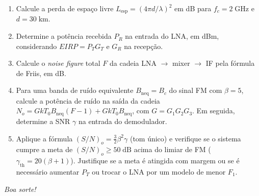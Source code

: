 \documentclass[11pt,a4paper]{article}
\begin{document}
\begin{enumerate}[label=\alph*)]
  \item Calcule a perda de espaço livre $L_{\text{esp}} = (4\pi d/\lambda)^2$ em dB para $f_c = 2\;\text{GHz}$ e $d = 30\;\text{km}$.
  \item Determine a potência recebida $P_R$ na entrada do LNA, em dBm, considerando $\mathit{EIRP} = P_T G_T$ e $G_R$ na recepção.
  \item Calcule o \emph{noise figure} total $F$ da cadeia LNA $\to$ mixer $\to$ IF pela fórmula de Friis, em dB.
  \item Para uma banda de ruído equivalente $B_{\text{neq}} = B_c$ do sinal FM com $\beta = 5$, calcule a potência de ruído na saída da cadeia $N_o = G k T_0 B_{\text{neq}}(F - 1) + G k T_0 B_{\text{neq}}$, com $G = G_1 G_2 G_3$. Em seguida, determine a SNR $\gamma$ na entrada do demodulador.
  \item Aplique a fórmula $(S/N)_o = \tfrac{3}{2}\beta^2 \gamma$ (tom único) e verifique se o sistema cumpre a meta de $(S/N)_o \ge 50\;\text{dB}$ acima do limiar de FM ($\gamma_{\text{th}} = 20(\beta+1)$). Justifique se a meta é atingida com margem ou se é necessário aumentar $P_T$ ou trocar o LNA por um modelo de menor $F_1$.
\end{enumerate}

\vfill
\begin{center}
  \small\textit{Boa sorte!}
\end{center}
\end{document}
